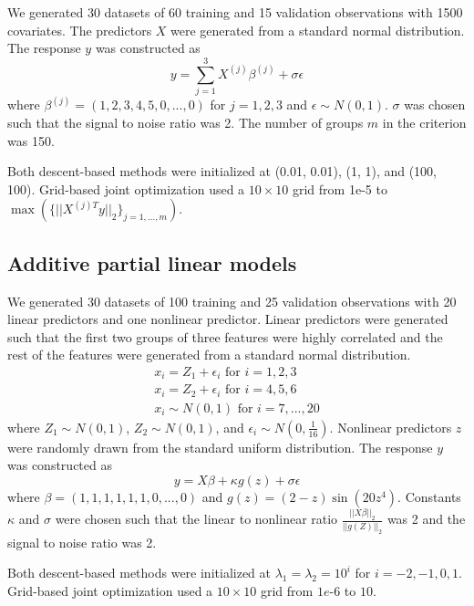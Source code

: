 \documentclass[10pt,letterpaper]{article}
\begin{document}
We generated 30 datasets of 60 training and 15 validation observations with 1500 covariates. The predictors $X$ were generated from a standard normal distribution. The response $y$ was constructed as
\begin{equation}
y = \sum\limits_{j=1}^3 X^{(j)} \beta^{(j)} + \sigma \epsilon
\end{equation}
where $\beta^{(j)} = (1, 2, 3, 4, 5, 0, ..., 0)$ for $j = 1, 2, 3$ and $\epsilon \sim N(0, 1)$. $\sigma$ was chosen such that the signal to noise ratio was 2. The number of groups $m$ in the criterion was 150.

Both descent-based methods were initialized at (0.01, 0.01), (1, 1), and (100, 100). Grid-based joint optimization used a $10 \times 10$ grid from 1e-5 to $\max(\{||X^{(j)T}y ||_2\}_{j=1,..., m})$.

\subsection{Additive partial linear models}

We generated 30 datasets of 100 training and 25 validation observations with 20 linear predictors and one nonlinear predictor. Linear predictors were generated such that the first two groups of three features were highly correlated and the rest of the features were generated from a standard normal distribution.
\begin{equation}
\begin{array}{c}
x_i = Z_1 + \epsilon_i \text{ for } i=1, 2, 3 \\
x_i = Z_2 + \epsilon_i \text{ for } i= 4, 5, 6 \\
x_i \sim N(0,1) \text{ for } i = 7, ..., 20
\end{array}
\end{equation}
where $Z_1 \sim N(0,1)$, $Z_2 \sim N(0,1)$, and $\epsilon_i \sim N(0, \frac{1}{16})$. Nonlinear predictors $z$ were randomly drawn from the standard uniform distribution. The response $y$ was constructed as
\begin{equation}
y = X\beta + \kappa g(z) + \sigma \epsilon
\end{equation}
where $\beta = (1, 1, 1, 1, 1, 1, 0, ..., 0)$ and $g(z) =(2-z)\sin(20z^4)$. Constants $\kappa$ and $\sigma$ were chosen such that the linear to nonlinear ratio $\frac{||X\beta||_2}{||g(Z)||_2}$ was 2 and the signal to noise ratio was 2. 

Both descent-based methods were initialized at $\lambda_1 = \lambda_2 = 10^i$ for $i=-2, -1, 0, 1$. Grid-based joint optimization used a $10 \times 10$ grid from $1e\text{-}6$ to $10$.
\end{document}
